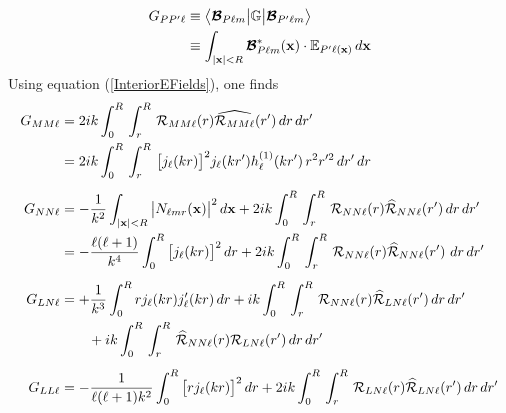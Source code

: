 \documentclass[letterpaper]{article}
\begin{document}
\begin{align*}
G_{PP^\prime \ell}
&\equiv
 \big\langle \boldsymbol{\mathcal{B}}_{P\ell m} \big| \mathbb{G} \big| \boldsymbol{\mathcal{B}}_{P^\prime \ell m} \big\rangle
\\
&\equiv
 \int_{|\mathbf{x}|<R}  \boldsymbol{\mathcal{B}}^*_{P\ell m}(\mathbf{x}) \cdot \mathbb{E}_{P^\prime \ell(\mathbf{x})}\,d\mathbf{x} 
\end{align*}
Using equation (\ref{InteriorEFields}), one finds
\begin{subequations}
\begin{align}
G_{MM\ell}&=2ik
 \int_0^R \, \int_r^R \, \mathcal{R}_{MM\ell}(r) \widehat{\mathcal{R}_{MM\ell}}(r^\prime)
  \,dr\,dr^\prime
\nonumber\\
&=2ik
 \int_0^R \, \int_r^R \, 
   \big [j_\ell(kr)\big]^2 j_\ell(kr^\prime) h_\ell^{(1)}(kr^\prime)\,
   r^2 r^{\prime 2}\, dr^\prime \, dr
\\[5pt]
G_{NN\ell}&=
 -\frac{1}{k^2}
  \int_{|\mathbf{x}|<R} \big| N_{\ell mr}(\mathbf{x})\big|^2\,d\mathbf{x}
  + 2ik \int_0^R \, \int_r^R \, \mathcal{R}_{NN\ell}(r) \widehat{\mathcal{R}}_{NN\ell}(r^\prime)
  \,dr\,dr^\prime
\nonumber\\
&=-\frac{\ell(\ell+1)}{k^4}\int_0^R \big[j_\ell(kr)\big]^2\,dr
  + 2ik \int_0^R \, \int_r^R \, 
   \mathcal{R}_{NN\ell}(r) \widehat{\mathcal{R}}_{NN\ell}(r^\prime)\,
  \,dr\,dr^\prime
\\[5pt]
G_{LN\ell}&=
 + \frac{1}{k^3}\int_0^R rj_\ell(kr) j^\prime_\ell(kr)\,dr
  + ik \int_0^R \, \int_r^R \, \mathcal{R}_{NN\ell}(r) \widehat{\mathcal{R}}_{LN\ell}(r^\prime)
  \,dr\,dr^\prime
\nonumber\\
&\qquad 
  + ik \int_0^R \, \int_r^R \, \widehat{\mathcal{R}}_{NN\ell}(r) \mathcal{R}_{LN\ell}(r^\prime)
  \,dr\,dr^\prime
\\[5pt]
G_{LL\ell}&=
 - \frac{1}{\ell(\ell+1)k^2}\int_0^R \big[rj_\ell(kr)\big]^2\,dr
  + 2ik \int_0^R \, \int_r^R \, \mathcal{R}_{LN\ell}(r) \widehat{\mathcal{R}}_{LN\ell}(r^\prime)
  \,dr\,dr^\prime
\end{align}
\end{subequations}
\end{document}
